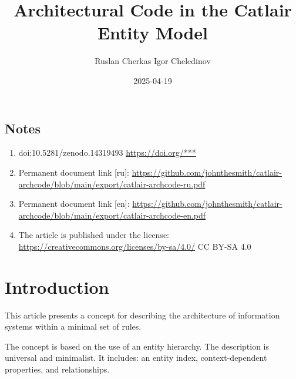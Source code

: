 \documentclass[final]{article}
\begin{document}
    \title{Architectural Code in the Catlair Entity Model}
    \author{
        Ruslan Cherkas
        Igor Cheledinov
    }
    \date{2025-04-19}

    \begin{small}
        \begingroup
        \renewcommand{\baselinestretch}{0.8}
        
        \renewcommand{\contentsname}{Contents}
        \maketitle
        \tableofcontents
        
        \section*{Notes}
            \begin{enumerate}
                \item doi:10.5281/zenodo.14319493
                \url{https://doi.org/***}
                
                \item Permanent document link [ru]:
                \url{https://github.com/johnthesmith/catlair-archcode/blob/main/export/catlair-archcode-ru.pdf}

                \item Permanent document link [en]:
                \url{https://github.com/johnthesmith/catlair-archcode/blob/main/export/catlair-archcode-en.pdf}

                \item The article is published under the license:
                \url{https://creativecommons.org/licenses/by-sa/4.0/} CC BY-SA 4.0
            \end{enumerate}
        \endgroup
    \end{small}


    \section{Introduction}

        This article presents a concept for describing the architecture of information systems
        within a minimal set of rules.

        The concept is based on the use of an entity hierarchy. The description is universal and minimalist.
        It includes: an entity index, context-dependent properties, and relationships.
\end{document}
